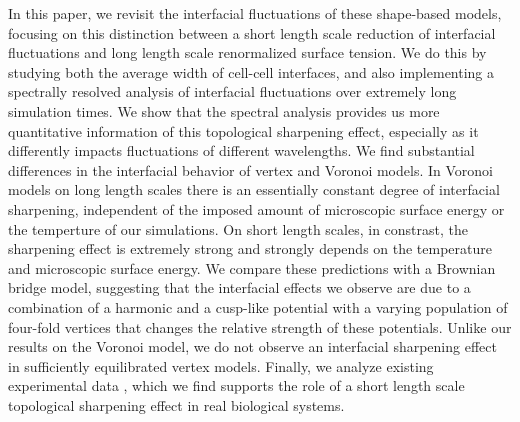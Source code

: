 \documentclass[twoside,twocolumn,9pt]{article}
\begin{document}
In this paper, we revisit the interfacial fluctuations of these shape-based models, focusing on this distinction between a short length scale reduction of interfacial fluctuations and long length scale renormalized surface tension. We do this by studying both the average width of cell-cell interfaces, and also implementing a spectrally resolved analysis of interfacial fluctuations over extremely long simulation times. We show that the spectral analysis provides us more quantitative information of this topological sharpening effect, especially as it differently impacts fluctuations of different wavelengths. We find substantial differences in the interfacial behavior of vertex and Voronoi models. In Voronoi models on long length scales there is an essentially constant degree of interfacial sharpening, independent of the imposed amount of microscopic surface energy or the temperture of our simulations. On short length scales, in constrast, the sharpening effect is extremely strong and strongly depends on the temperature and microscopic surface energy. We compare these predictions with a Brownian bridge model, suggesting that the interfacial effects we observe are due to a combination of a harmonic and a cusp-like potential with a varying population of four-fold vertices that changes the relative strength of these potentials. Unlike our results on the Voronoi model, we do not observe an interfacial sharpening effect in sufficiently equilibrated vertex models. Finally, we analyze existing experimental data \cite{guan2023interfacial}, which we find supports the role of a short length scale topological sharpening effect in real biological systems. 
\end{document}
